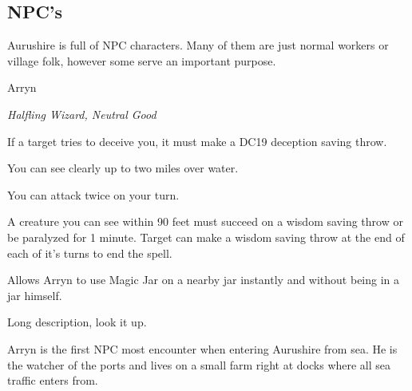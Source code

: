 \subsection{NPC's}

Aurushire is full of NPC characters. Many of them are just normal workers or village folk, however some serve an important purpose.

\begin{monsterbox}{Arryn}
	\begin{hangingpar}
		\textit{Halfling Wizard, Neutral Good}
	\end{hangingpar}
	\dndline%
	\basics[%
	armorclass = 17,
	hitpoints  = 172,
	speed      = 40 ft
	]
	\dndline%
	\stats[
	STR = \stat{12}, %
	DEX = \stat{12},
	CON = \stat{16},
	INT = \stat{20},
	WIS = \stat{18},
	CHA = \stat{18}
	]
	\dndline%
	\details[%
	languages = {Common, Elvish, Dwarvish, Gnomish, Halfling, Orc, Pandaren},
	]
	\dndline%
	\begin{monsteraction}
		If a target tries to deceive you, it must make a DC19 deception saving throw.
	\end{monsteraction}	
	\begin{monsteraction}
		You can see clearly up to two miles over water.
	\end{monsteraction}
	\begin{monsteraction}
		You can attack twice on your turn.
	\end{monsteraction}
	\begin{monsteraction}
		A creature you can see within 90 feet must succeed on a wisdom saving throw or be paralyzed for 1 minute. Target can make a wisdom saving throw at the end of each of it's turns to end the spell.
	\end{monsteraction}
	\begin{monsteraction}
		Allows Arryn to use Magic Jar on a nearby jar instantly and without being in a jar himself.
	\end{monsteraction}
	\begin{monsteraction}
		Long description, look it up.
	\end{monsteraction}
	Arryn is the first NPC most encounter when entering Aurushire from sea. He is the watcher of the ports and lives on a small farm right at docks where all sea traffic enters from.
\end{monsterbox}

